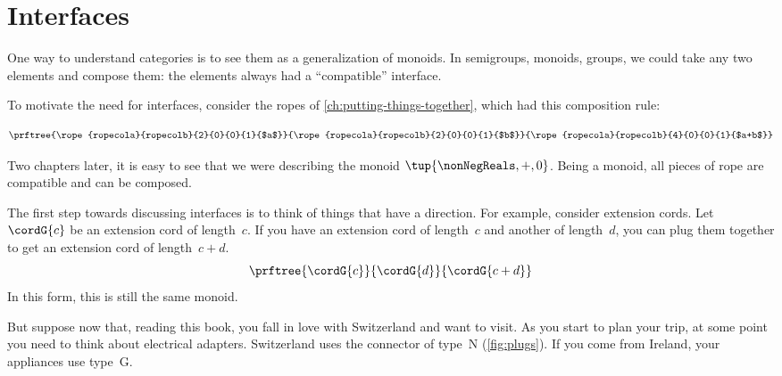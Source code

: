 

\section{Interfaces}\label{sec:interfaces}

One way to understand categories is to see them as a generalization of monoids.
In semigroups, monoids, groups, we could take any two elements and compose them: the elements always had a ``compatible'' interface.

To motivate the need for interfaces, consider the ropes of \cref{ch:putting-things-together},
which had this composition rule:

\begin{equation*}
    \prftree{\rope{ropecola}{ropecolb}{2}{0}{0}{1}{$a$}}
    {\rope{ropecola}{ropecolb}{2}{0}{0}{1}{$b$}}
    {\rope{ropecola}{ropecolb}{4}{0}{0}{1}{$a+b$}}
\end{equation*}

Two chapters later, it is easy to see that we were describing the monoid $\tup{\nonNegReals, +, 0}$.
Being a monoid, all pieces of rope are compatible and can be composed.

The first step towards discussing interfaces is to think of things that have a direction.
For example, consider extension cords. Let~$\cordG{c}$ be an extension cord of length~$c$.
If you have an extension cord of length~$c$ and another of length~$d$, you can plug them together to get an extension cord of length~$c+d$.
%
\begin{equation}
    \label{eq:cords}
    \prftree{\cordG{c}}{\cordG{d}}{\cordG{c+d}}
\end{equation}
%
In this form, this is still the same monoid.

But suppose now that, reading this book, you fall in love with Switzerland and want to visit.
As you start to plan your trip, at some point you need to think about electrical adapters.
Switzerland uses the connector of type~N (\cref{fig:plugs}).
If you come from Ireland, your appliances use type~G.

